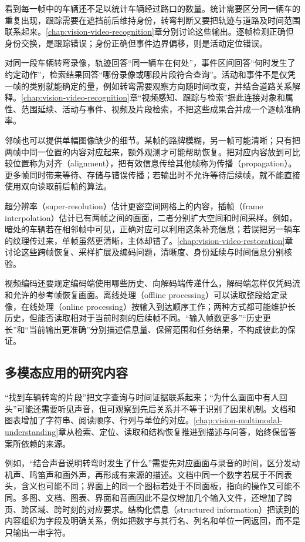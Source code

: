 看到每一帧中的车辆还不足以统计车辆经过路口的数量。统计需要区分同一辆车的重复出现，跟踪需要在遮挡前后维持身份，转弯判断又要把轨迹与道路及时间范围联系起来。\ref{chap:vision-video-recognition}章分别讨论这些输出。逐帧检测正确但身份交换，是跟踪错误；身份正确但事件边界偏移，则是活动定位错误。

对同一段车辆转弯录像，轨迹回答“同一辆车在何处”，事件区间回答“何时发生了约定动作”，检索结果回答“哪份录像或哪段片段符合查询”。活动和事件不是仅凭一帧的类别就能确定的量，例如转弯需要观察方向随时间改变，并结合道路关系解释。\ref{chap:vision-video-recognition}章“视频感知、跟踪与检索”据此连接对象和属性、范围延续、活动与事件、视频及片段检索，不把这些成果合并成一个逐帧准确率。

邻帧也可以提供单幅图像缺少的细节。某帧的路牌模糊，另一帧可能清晰；只有把两帧中同一位置的内容对应起来，额外观测才可能帮助恢复。把对应内容放到可比较位置称为对齐（alignment），把有效信息传给其他帧称为传播（propagation）。更多帧同时带来等待、存储与错误传播；若输出时不允许等待后续帧，就不能直接使用双向读取前后帧的算法。

超分辨率（super-resolution）估计更密空间网格上的内容，插帧（frame interpolation）估计已有两帧之间的画面，二者分别扩大空间和时间采样。例如，暗处的车辆若在相邻帧中可见，正确对应可以利用这条补充信息；若误把另一辆车的纹理传过来，单帧虽然更清晰，主体却错了。\ref{chap:vision-video-restoration}章讨论这些跨帧恢复、采样扩展及编码问题，清晰度、身份延续与时间信息分别核验。

视频编码还要规定编码端使用哪些历史、向解码端传递什么，解码端怎样仅凭码流和允许的参考帧恢复画面。离线处理（offline processing）可以读取整段给定录像，在线处理（online processing）按输入到达顺序工作；两种方式都可能维护长历史，但能否读取相对于当前时刻的后续帧不同。“输入帧数更多”“历史更长”和“当前输出更准确”分别描述信息量、保留范围和任务结果，不构成彼此的保证。

\subsection{多模态应用的研究内容}
\label{sec:vision-overview-multimodal-tasks}

“找到车辆转弯的片段”把文字查询与时间证据联系起来；“为什么画面中有人回头”可能还需要听见声音，但可观察到先后关系并不等于识别了因果机制。文档和图表增加了字符串、阅读顺序、行列与单位的对应。\ref{chap:vision-multimodal-understanding}章从检索、定位、读取和结构恢复推进到描述与问答，始终保留答案所依赖的来源。

例如，“结合声音说明转弯时发生了什么”需要先对应画面与录音的时间，区分发动机声、鸣笛声和画外声，再形成有来源的描述。文档中同一个数字若属于不同表头，含义也可能不同；界面上的同一个图标若处于不同面板，指向的操作又可能不同。多图、文档、图表、界面和音画因此不是仅增加几个输入文件，还增加了跨页、跨区域、跨时刻的对应要求。结构化信息（structured information）把读到的内容组织为字段及明确关系，例如把数字与其行名、列名和单位一同返回，而不是只输出一串字符。

